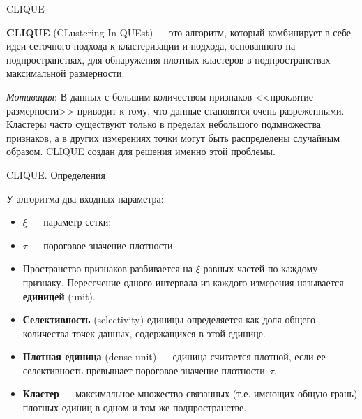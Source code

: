 \documentclass[unicode, notheorems, handout]{beamer}
\begin{document}
\begin{frame}{CLIQUE}
\small 

    \textbf{CLIQUE} (CLustering In QUEst) --- это алгоритм, который комбинирует в себе идеи сеточного подхода к кластеризации и подхода, основанного на подпространствах, для обнаружения плотных кластеров в подпространствах максимальной размерности.
\vspace{1.2ex}

    \emph{Мотивация}: В данных с большим количеством признаков <<проклятие размерности>> приводит к тому, что данные становятся очень разреженными. Кластеры часто существуют только в пределах небольшого подмножества признаков, а в других измерениях точки могут быть распределены случайным образом. CLIQUE создан для решения именно этой проблемы.
\end{frame}

\begin{frame}{CLIQUE. Определения}
\small 

У алгоритма два входных параметра:
 \begin{itemize}
    \item[\ding{87}] $\xi$ --- параметр сетки;
    \item[\ding{87}] $\tau$ --- пороговое значение плотности.
\end{itemize}
\vspace{1ex}


\begin{itemize}
    \item Пространство признаков разбивается на $\xi$ равных частей по каждому признаку. Пересечение одного интервала из каждого измерения называется \textbf{единицей} (unit).

    \item \textbf{Селективность} (selectivity) единицы определяется как доля общего количества точек данных, содержащихся в этой единице. 

    \item \textbf{Плотная единица} (dense unit) --- единица считается плотной, если ее селективность превышает пороговое значение плотности~$\tau$.

    \item \textbf{Кластер} --- максимальное множество связанных (т.е. имеющих общую грань) плотных единиц в одном и том же подпространстве.
\end{itemize}

\end{frame}
\end{document}
